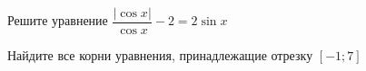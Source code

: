 \begin{ex}
	\begin{condition}
		\begin{enumcols}[label=\asbuk*)]
			\item Решите уравнение \( \dfrac{|\cos x|}{\cos x}- 2 =2\sin x \)
			\item Найдите все корни уравнения, принадлежащие отрезку \( \left[-1;7\right] \)
		\end{enumcols}
	\end{condition}
\end{ex}